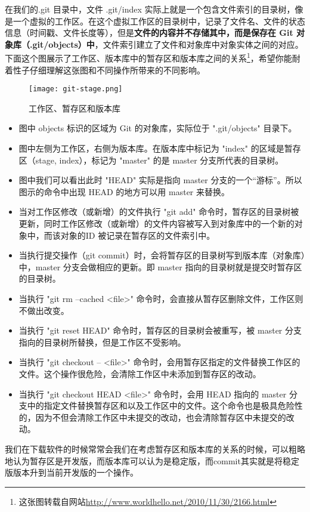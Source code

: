 在我们的.git 目录中，文件 .git/index 实际上就是一个包含文件索引的目录树，像是一个虚拟的工作区。在这个虚拟工作区的目录树中，记录了文件名、文件的状态信息（时间戳、文件长度等），但是\textbf{文件的内容并不存储其中，而是保存在 Git 对象库（.git/objects）中}，文件索引建立了文件和对象库中对象实体之间的对应。下面这个图展示了工作区、版本库中的暂存区和版本库之间的关系\footnote{这张图转载自网站\url{http://www.worldhello.net/2010/11/30/2166.html}}，希望你能耐着性子仔细理解这张图和不同操作所带来的不同影响。

\begin{figure}[htbp]
  \centering
  \texttt{[image: git-stage.png]}
  \caption{工作区、暂存区和版本库}\label{fig:git-stage.png} 
\end{figure}

\begin{itemize}
\item 图中 objects 标识的区域为 Git 的对象库，实际位于 ".git/objects" 目录下。
\item 图中左侧为工作区，右侧为版本库。在版本库中标记为 "index" 的区域是暂存区（stage, index），标记为 "master" 的是 master 分支所代表的目录树。
\item 图中我们可以看出此时 "HEAD" 实际是指向 master 分支的一个“游标”。所以图示的命令中出现 HEAD 的地方可以用 master 来替换。
\item 当对工作区修改（或新增）的文件执行 "git add" 命令时，暂存区的目录树被更新，同时工作区修改（或新增）的文件内容被写入到对象库中的一个新的对象中，而该对象的ID 被记录在暂存区的文件索引中。
\item 当执行提交操作（git commit）时，会将暂存区的目录树写到版本库（对象库）中，master 分支会做相应的更新。即 master 指向的目录树就是提交时暂存区的目录树。
\item 当执行 "git rm --cached <file>" 命令时，会直接从暂存区删除文件，工作区则不做出改变。
\item 当执行 "git reset HEAD" 命令时，暂存区的目录树会被重写，被 master 分支指向的目录树所替换，但是工作区不受影响。
\item 当执行 "git checkout -- <file>" 命令时，会用暂存区指定的文件替换工作区的文件。这个操作很危险，会清除工作区中未添加到暂存区的改动。
\item 当执行 "git checkout HEAD <file>" 命令时，会用 HEAD 指向的 master 分支中的指定文件替换暂存区和以及工作区中的文件。这个命令也是极具危险性的，因为不但会清除工作区中未提交的改动，也会清除暂存区中未提交的改动。
\end{itemize}

我们在下载软件的时候常常会我们在考虑暂存区和版本库的关系的时候，可以粗略地认为暂存区是开发版，而版本库可以认为是稳定版，而commit其实就是将稳定版版本升到当前开发版的一个操作。
 
